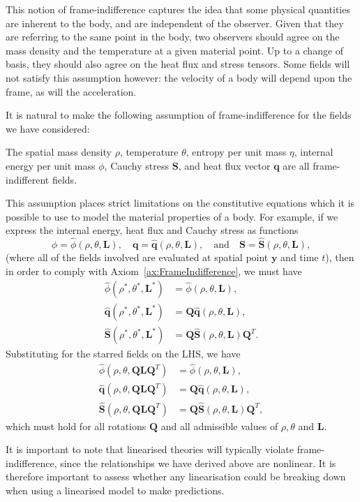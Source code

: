 \documentclass[
  letterpaper,
  DIV=11,
  numbers=noendperiod]{scrreprt}
\theoremstyle{plain}
\theoremstyle{remark}
\begin{document}
This notion of frame-indifference captures the idea that some physical
quantities are inherent to the body, and are independent of the
observer. Given that they are referring to the same point in the body,
two observers should agree on the mass density and the temperature at a
given material point. Up to a change of basis, they should also agree on
the heat flux and stress tensors. Some fields will not satisfy this
assumption however: the velocity of a body will depend upon the frame,
as will the acceleration.

It is natural to make the following assumption of frame-indifference for
the fields we have considered:

\label{ax:FrameIndifference}{} The spatial mass density
\(\rho\), temperature \(\theta\), entropy per unit mass \(\eta\),
internal energy per unit mass \(\phi\), Cauchy stress
\({\boldsymbol{S}}\), and heat flux vector \({\boldsymbol{q}}\) are all
frame-indifferent fields.

This assumption places strict limitations on the constitutive equations
which it is possible to use to model the material properties of a body.
For example, if we express the internal energy, heat flux and Cauchy
stress as functions
\[\phi = \widehat{\phi}(\rho,\theta,{\boldsymbol{L}}),\quad
  {\boldsymbol{q}}= \widehat{{\boldsymbol{q}}}(\rho,\theta,{\boldsymbol{L}}),\quad\text{and}\quad
  {\boldsymbol{S}}= \widehat{{\boldsymbol{S}}}(\rho,\theta,{\boldsymbol{L}}),\]
(where all of the fields involved are evaluated at spatial point
\({\boldsymbol{y}}\) and time \(t\)), then in order to comply with
Axiom~\hyperref[ax:FrameIndifference]{{[}ax:FrameIndifference{]}}, we
must have \[\begin{aligned}
  \widehat{\phi}(\rho^*,\theta^*,{\boldsymbol{L}}^*) &= \widehat{\phi}(\rho,\theta,{\boldsymbol{L}}),\\
  \widehat{{\boldsymbol{q}}}(\rho^*,\theta^*,{\boldsymbol{L}}^*) &= {\boldsymbol{Q}}\widehat{{\boldsymbol{q}}}(\rho,\theta,{\boldsymbol{L}}),\\
  \widehat{{\boldsymbol{S}}}(\rho^*,\theta^*,{\boldsymbol{L}}^*) &= {\boldsymbol{Q}}\widehat{{\boldsymbol{S}}}(\rho,\theta,{\boldsymbol{L}}){\boldsymbol{Q}}^T.
\end{aligned}\] Substituting for the starred fields on the LHS, we have
\[\begin{aligned}
  \widehat{\phi}(\rho,\theta,{\boldsymbol{Q}}{\boldsymbol{L}}{\boldsymbol{Q}}^T) &= \widehat{\phi}(\rho,\theta,{\boldsymbol{L}}),\\
  \widehat{{\boldsymbol{q}}}(\rho,\theta,{\boldsymbol{Q}}{\boldsymbol{L}}{\boldsymbol{Q}}^T) &= {\boldsymbol{Q}}\widehat{{\boldsymbol{q}}}(\rho,\theta,{\boldsymbol{L}}),\\
  \widehat{{\boldsymbol{S}}}(\rho,\theta,{\boldsymbol{Q}}{\boldsymbol{L}}{\boldsymbol{Q}}^T) &= {\boldsymbol{Q}}\widehat{{\boldsymbol{S}}}(\rho,\theta,{\boldsymbol{L}}){\boldsymbol{Q}}^T,
\end{aligned}\] which must hold for all rotations \({\boldsymbol{Q}}\)
and all admissible values of \(\rho, \theta\) and \({\boldsymbol{L}}\).

It is important to note that linearised theories will typically violate
frame-indifference, since the relationships we have derived above are
nonlinear. It is therefore important to assess whether any linearisation
could be breaking down when using a linearised model to make
predictions.
\end{document}
